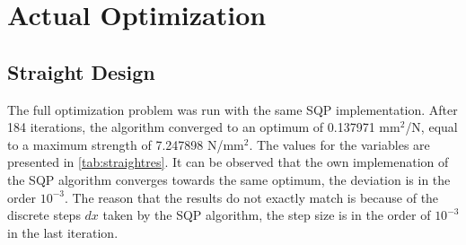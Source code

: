 
\section{Actual Optimization}
\subsection{Straight Design}
The full optimization problem was run with the same SQP implementation. After 184 iterations, the algorithm converged to an optimum of 0.137971 mm$^2$/N, equal to a maximum strength of 7.247898 N/mm$^2$. The values for the variables are presented in \autoref{tab:straightres}. It can be observed that the own implemenation of the SQP algorithm converges towards the same optimum, the deviation is in the order $10^{-3}$. The reason that the results do not exactly match is because of the discrete steps $dx$ taken by the SQP algorithm, the step size is in the order of $10^{-3}$ in the last iteration. 


